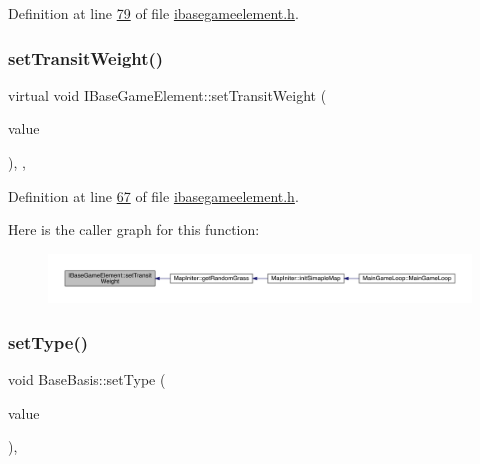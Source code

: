 Definition at line \hyperlink{a00047_source_l00079}{79} of file \hyperlink{a00047_source}{ibasegameelement.\+h}.

\mbox{\label{a00137_ac480b8140b5b290f49b4b96a47291180}} 
\subsubsection{\texorpdfstring{set\+Transit\+Weight()}{setTransitWeight()}}
{\footnotesize\ttfamily virtual void I\+Base\+Game\+Element\+::set\+Transit\+Weight (\begin{DoxyParamCaption}\item[{\hyperlink{a00161}{Infinity\+Double} $\ast$}]{value }\end{DoxyParamCaption})\hspace{0.3cm}{\ttfamily [inline]}, {\ttfamily [virtual]}, {\ttfamily [inherited]}}



Definition at line \hyperlink{a00047_source_l00067}{67} of file \hyperlink{a00047_source}{ibasegameelement.\+h}.

Here is the caller graph for this function\+:
\nopagebreak
\begin{figure}[H]
\begin{center}
\leavevmode
\includegraphics[width=350pt]{d2/df5/a00137_ac480b8140b5b290f49b4b96a47291180_icgraph}
\end{center}
\end{figure}
\mbox{\label{a00149_ac31b2ea48f47f1bc2baaf1971243b506}} 
\subsubsection{\texorpdfstring{set\+Type()}{setType()}}
{\footnotesize\ttfamily void Base\+Basis\+::set\+Type (\begin{DoxyParamCaption}\item[{int}]{value }\end{DoxyParamCaption})\hspace{0.3cm}{\ttfamily [override]}, {\ttfamily [virtual]}}



